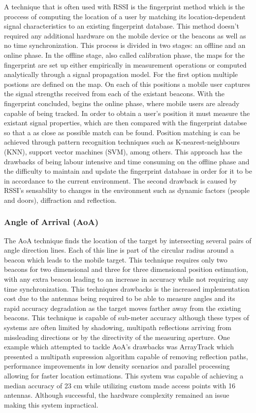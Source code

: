 A technique that is often used with \ac{RSSI} is the fingerprint method which is the proccess of computing the location of a user by matching its location-dependent signal characteristics to an existing fingerprint database. This method doesn't required any additional hardware on the mobile device or the beacons as well as no time synchronization. This process is divided in two stages: an offline and an online phase. In the offline stage, also called calibration phase, the maps for the fingerprint are set up either empirically in measurement operations or computed analytically through a signal propagation model. For the first option multiple postions are defined on the map. On each of this positions a mobile user captures the signal strengths received from each of the existant beacons. With the fingerprint concluded, begins the online phase, where mobile users are already capable of being tracked. In order to obtain a user's position it must measure the existant signal properties, which are then compared with the fingerprint databse so that a as close as possible match can be found. Position matching is can be achieved through pattern recognition techniques such as K-nearest-neighbours (KNN), support vector machines (SVM), among others.
This approach has the drawbacks of being labour intensive and time consuming on the offline phase and the difficulty to maintain and update the fingerprint database in order for it to be in accordance to the current environment. The second drawback is caused by \ac{RSSI}'s sensability to changes in the environment such as dynamic factors (people and doors), diffraction and reflection. 


\subsubsection{Angle of Arrival (AoA) }
\label{subsubsec:aoa}

The \ac{AoA} technique finds the location of the target by intersecting several pairs of angle direction lines. Each of this line is part of the circular radius around a beacon which leads to the mobile target. This technique requires only two beacons for two dimensional and three for three dimensional position estimation, with any extra beacon leading to an increase in accuracy while not requiring any time synchronization.
This techniques drawbacks is the increased implementation cost due to the antennas being required to be able to measure angles and its rapid accuracy degradation as the target moves farther away from the existing beacons. This technique is capable of sub-meter accuracy although these types of systems are often limited by shadowing, multipath reflections arriving from missleading directions or by the directivity of the measuring aperture. 
One example which attempted to tackle \ac{AoA}'s drawbacks was ArrayTrack \cite{arraytrack} which presented a multipath supression algorithm capable of removing reflection paths, performance improvements in low density scenarios and parallel processing allowing for faster location estimations. This system was capable of achieving a median accuracy of 23 cm while utilizing custom made access points with 16 antennas. Although successful, the hardware complexity remained an issue making this system inpractical.


